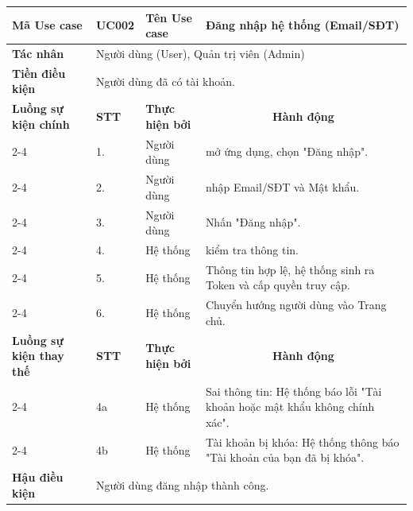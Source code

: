 \begin{longtable}{|p{2.7cm}|p{0.8cm}|p{2.6cm}|p{7.3cm}|}
\hline
\cellcolor[HTML]{D5F5E3}\textbf{Mã Use case} & \multicolumn{1}{l|}{UC002} & \cellcolor[HTML]{D5F5E3}\textbf{Tên Use case} & Đăng nhập hệ thống (Email/SĐT) \\ \hline
\cellcolor[HTML]{D5F5E3}\textbf{Tác nhân} & \multicolumn{3}{p{10.7cm}|}{Người dùng (User), Quản trị viên (Admin)} \\ \hline
\cellcolor[HTML]{D5F5E3}\textbf{Tiền điều kiện} & \multicolumn{3}{p{10.7cm}|}{Người dùng đã có tài khoản.} \\ \hline

\cellcolor[HTML]{D5F5E3}\textbf{Luồng sự kiện chính} & \cellcolor[HTML]{FDEBD0}\textbf{STT} & \cellcolor[HTML]{FDEBD0}\textbf{Thực hiện bởi} & \multicolumn{1}{c|}{\cellcolor[HTML]{FDEBD0}\textbf{Hành động}} \\ \cline{2-4} 
\cellcolor[HTML]{D5F5E3} & 1. & Người dùng & mở ứng dụng, chọn "Đăng nhập". \\ \cline{2-4} 
\cellcolor[HTML]{D5F5E3} & 2. & Người dùng & nhập Email/SĐT và Mật khẩu. \\ \cline{2-4} 
\cellcolor[HTML]{D5F5E3} & 3. & Người dùng & Nhấn "Đăng nhập". \\ \cline{2-4} 
\cellcolor[HTML]{D5F5E3} & 4. & Hệ thống & kiểm tra thông tin. \\ \cline{2-4} 
\cellcolor[HTML]{D5F5E3} & 5. & Hệ thống & Thông tin hợp lệ, hệ thống sinh ra Token và cấp quyền truy cập. \\ \cline{2-4} 
\cellcolor[HTML]{D5F5E3} & 6. & Hệ thống & Chuyển hướng người dùng vào Trang chủ. \\ \hline

\cellcolor[HTML]{D5F5E3}\textbf{Luồng sự kiện thay thế} & \cellcolor[HTML]{FDEBD0}\textbf{STT} & \cellcolor[HTML]{FDEBD0}\textbf{Thực hiện bởi} & \multicolumn{1}{c|}{\cellcolor[HTML]{FDEBD0}\textbf{Hành động}} \\ \cline{2-4} 
\cellcolor[HTML]{D5F5E3} & 4a & Hệ thống & Sai thông tin: Hệ thống báo lỗi "Tài khoản hoặc mật khẩu không chính xác". \\ \cline{2-4} 
\cellcolor[HTML]{D5F5E3} & 4b & Hệ thống & Tài khoản bị khóa: Hệ thống thông báo "Tài khoản của bạn đã bị khóa". \\ \hline

\cellcolor[HTML]{D5F5E3}\textbf{Hậu điều kiện} & \multicolumn{3}{p{10.7cm}|}{Người dùng đăng nhập thành công.} \\ \hline
\end{longtable}
\endgroup

